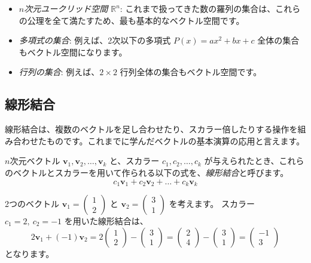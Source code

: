 \begin{ex}
\begin{itemize}
\item \emph{$n$次元ユークリッド空間 $\mathbb{R}^n$}: これまで扱ってきた数の羅列の集合は、これらの公理を全て満たすため、最も基本的なベクトル空間です。
\item \emph{多項式の集合}: 例えば、2次以下の多項式 $P(x) = ax^2 + bx + c$ 全体の集合もベクトル空間になります。
\item \emph{行列の集合}: 例えば、$2 \times 2$ 行列全体の集合もベクトル空間です。
\end{itemize}
\end{ex}

\subsection{線形結合}

線形結合は、複数のベクトルを足し合わせたり、スカラー倍したりする操作を組み合わせたものです。これまでに学んだベクトルの基本演算の応用と言えます。
\begin{dfn}[線形結合]
$n$次元ベクトル $\bm{v}_1, \bm{v}_2, \ldots, \bm{v}_k$ と、スカラー $c_1, c_2, \ldots, c_k$ が与えられたとき、これらのベクトルとスカラーを用いて作られる以下の式を、\emph{線形結合}と呼びます。
\[c_1 \bm{v}_1 + c_2 \bm{v}_2 + \dots + c_k \bm{v}_k\]
\end{dfn}
\begin{ex}
2つのベクトル $\bm{v}_1 = \begin{pmatrix} 1 \\ 2 \end{pmatrix}$ と $\bm{v}_2 = \begin{pmatrix} 3 \\ 1 \end{pmatrix}$ を考えます。
スカラー $c_1 = 2,\ c_2 = -1$ を用いた線形結合は、
$$2\bm{v}_1 + (-1)\bm{v}_2 = 2\begin{pmatrix} 1 \\ 2 \end{pmatrix} - \begin{pmatrix} 3 \\ 1 \end{pmatrix} = \begin{pmatrix} 2 \\ 4 \end{pmatrix} - \begin{pmatrix} 3 \\ 1 \end{pmatrix} = \begin{pmatrix} -1 \\ 3 \end{pmatrix}$$
となります。
\end{ex}

